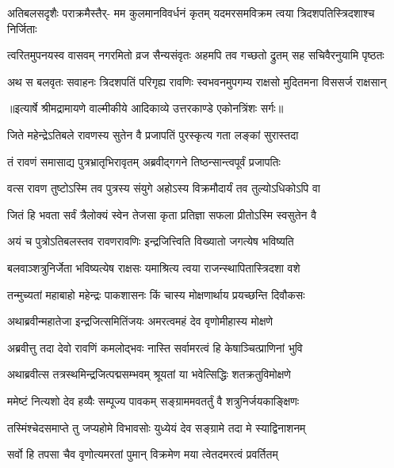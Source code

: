 \fourlineindentedshloka
{अतिबलसदृशैः पराक्रमैस्तैर्-}
{मम कुलमानविवर्धनं कृतम्}
{यदमरसमविक्रम त्वया}
{त्रिदशपतिस्त्रिदशाश्च निर्जिताः} %

\fourlineindentedshloka
{त्वरितमुपनयस्व वासवम्}
{नगरमितो व्रज सैन्यसंवृतः}
{अहमपि तव गच्छतो द्रुतम्}
{सह सचिवैरनुयामि पृष्ठतः} %

\fourlineindentedshloka
{अथ स बलवृतः सवाहनः}
{त्रिदशपतिं परिगृह्य रावणिः}
{स्वभवनमुपगम्य राक्षसो}
{मुदितमना विससर्ज राक्षसान्} %


{॥इत्यार्षे श्रीमद्रामायणे वाल्मीकीये आदिकाव्ये उत्तरकाण्डे एकोनत्रिंशः सर्गः॥}


\twolineshloka
{जिते महेन्द्रेऽतिबले रावणस्य सुतेन वै}
{प्रजापतिं पुरस्कृत्य गता लङ्कां सुरास्तदा} %

\twolineshloka
{तं रावणं समासाद्य पुत्रभ्रातृभिरावृतम्}
{अब्रवीद्गगने तिष्ठन्सान्त्वपूर्वं प्रजापतिः} %

\twolineshloka
{वत्स रावण तुष्टोऽस्मि तव पुत्रस्य संयुगे}
{अहोऽस्य विक्रमौदार्यं तव तुल्योऽधिकोऽपि वा} %

\twolineshloka
{जितं हि भवता सर्वं त्रैलोक्यं स्वेन तेजसा}
{कृता प्रतिज्ञा सफला प्रीतोऽस्मि स्वसुतेन वै} %

\twolineshloka
{अयं च पुत्रोऽतिबलस्तव रावणरावणिः}
{इन्द्रजित्त्विति विख्यातो जगत्येष भविष्यति} %

\twolineshloka
{बलवाञ्शत्रुनिर्जेता भविष्यत्येष राक्षसः}
{यमाश्रित्य त्वया राजन्स्थापितास्त्रिदशा वशे} %

\twolineshloka
{तन्मुच्यतां महाबाहो महेन्द्रः पाकशासनः}
{किं चास्य मोक्षणार्थाय प्रयच्छन्ति दिवौकसः} %

\twolineshloka
{अथाब्रवीन्महातेजा इन्द्रजित्समितिंजयः}
{अमरत्वमहं देव वृणोमीहास्य मोक्षणे} %

\twolineshloka
{अब्रवीत्तु तदा देवो रावणिं कमलोद्भवः}
{नास्ति सर्वामरत्वं हि केषाञ्चित्प्राणिनां भुवि} %

\twolineshloka
{अथाब्रवीत्स तत्रस्थमिन्द्रजित्पद्मसम्भवम्}
{श्रूयतां या भवेत्सिद्धिः शतक्रतुविमोक्षणे} %

\twolineshloka
{ममेष्टं नित्यशो देव हव्यैः सम्पूज्य पावकम्}
{सङ्ग्राममवतर्तुं वै शत्रुनिर्जयकाङ्क्षिणः} %

\twolineshloka
{तस्मिंश्चेदसमाप्ते तु जप्यहोमे विभावसोः}
{युध्येयं देव सङ्ग्रामे तदा मे स्याद्विनाशनम्} %

\twolineshloka
{सर्वो हि तपसा चैव वृणोत्यमरतां पुमान्}
{विक्रमेण मया त्वेतदमरत्वं प्रवर्तितम्} %

